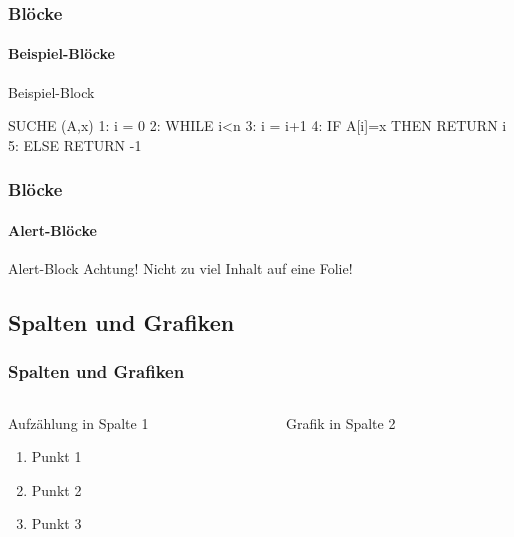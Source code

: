 \documentclass[%
14pt
]{beamer}
\begin{document}

\begin{frame}[fragile]
	\frametitle{Blöcke}
	\framesubtitle{Beispiel-Blöcke}
	\begin{exampleblock}{Beispiel-Block}
	\begin{semiverbatim}
SUCHE (A,x)
1: i = 0
2: WHILE i<n
3:     i = i+1
4:     \alert{IF A[i]=x THEN RETURN i}
5: ELSE RETURN -1
	\end{semiverbatim}
	\end{exampleblock}
\end{frame}


\begin{frame}
	\frametitle{Blöcke}
	\framesubtitle{Alert-Blöcke}
	\Large
	\begin{alertblock}{Alert-Block}
		\centering
		Achtung! Nicht zu viel Inhalt auf eine Folie!
	\end{alertblock}
\end{frame}


\subsection{Spalten und Grafiken}
\begin{frame}
	\frametitle{Spalten und Grafiken}
	\begin{columns}
		\begin{column}{0.5\textwidth}
			Aufzählung in Spalte 1
			\begin{enumerate}
				\item Punkt 1
				\item Punkt 2
				\item Punkt 3
			\end{enumerate}
		\end{column}
		\begin{column}{0.5\textwidth}
			\begin{center}

			Grafik in Spalte 2
			\end{center}
		\end{column}
	\end{columns}
\end{frame}

\end{document}
